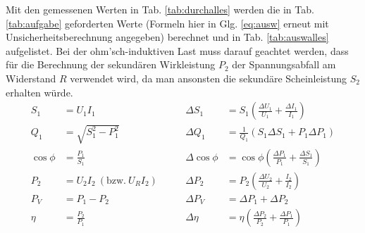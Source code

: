 \documentclass[12pt,a4paper,twoside]{article}
\theoremstyle{definition}
\begin{document}
Mit den gemessenen Werten in Tab. \ref{tab:durchalles} werden die in Tab. \ref{tab:aufgabe} geforderten Werte (Formeln hier in Glg. \ref{eq:ausw} erneut mit Unsicherheitsberechnung angegeben) berechnet und in Tab. \ref{tab:auswalles} aufgelistet. Bei der ohm'sch-induktiven Last muss darauf geachtet werden, dass für die Berechnung der sekundären Wirkleistung $P_2$ der Spannungsabfall am Widerstand $R$ verwendet wird, da man ansonsten die sekundäre Scheinleistung $S_2$ erhalten würde.
\begin{equation}
\begin{aligned}
    S_1 &= U_1 I_1                              &\qquad \Delta S_1 &= S_1 \left( \frac{\Delta U_1}{U_1} + \frac{\Delta I_1}{I_1} \right) \\
    Q_1 &= \sqrt{S_1^2 - P_1^2}                 &\qquad \Delta Q_1 &= \frac{1}{Q_1} \left( S_1 \Delta S_1 + P_1 \Delta P_1 \right) \\
    \cos \phi &= \frac{P_1}{S_1}                &\qquad \Delta \cos \phi &= \cos \phi \left( \frac{\Delta P_1}{P_1} + \frac{\Delta S_1}{S_1} \right) \\
    P_2 &= U_2 I_2 \ (\text{bzw.} \ U_R I_2)    &\qquad \Delta P_2 &= P_2 \left( \frac{\Delta U_2}{U_2} + \frac{I_2}{I_2} \right) \\
    P_V &= P_1 - P_2                            &\qquad \Delta P_V &= \Delta P_1 + \Delta P_2 \\
    \eta &= \frac{P_2}{P_1}                     &\qquad \Delta \eta &= \eta \left( \frac{\Delta P_2}{P_2} + \frac{\Delta P_1}{P_1} \right)
    \label{eq:ausw}
\end{aligned}
\end{equation}
\end{document}
